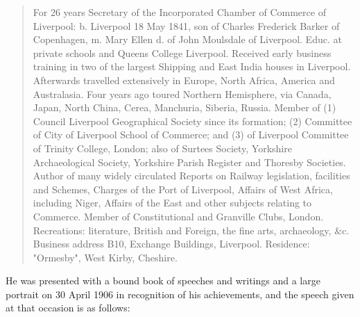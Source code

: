 \begin{quotation}
For 26 years Secretary of the Incorporated Chamber of Commerce of Liverpool: b. Liverpool 18 May 1841, son of Charles Frederick Barker of Copenhagen, m. Mary Ellen d. of John Moulsdale of Liverpool. Educ. at private schools and Queens College Liverpool. Received early business training in two of the largest Shipping and East India houses in Liverpool. Afterwards travelled extensively in Europe, North Africa, America and Australasia. Four years ago toured Northern Hemisphere, via Canada, Japan, North China, Cerea, Manchuria, Siberia, Russia. Member of (1) Council Liverpool Geographical Society since its formation; (2) Committee of City of Liverpool School of Commerce; and (3) of Liverpool Committee of Trinity College, London; also of Surtees Society, Yorkshire Archaeological Society, Yorkshire Parish Register and Thoresby Societies. Author of many widely circulated Reports on Railway legislation, facilities and Schemes, Charges of the Port of Liverpool, Affairs of West Africa, including Niger, Affairs of the East and other subjects relating to Commerce. Member of Constitutional and Granville Clubs, London. Recreations: literature, British and Foreign, the fine arts, archaeology, \&c. Business address B10, Exchange Buildings, Liverpool. Residence: "Ormesby", West Kirby, Cheshire.
\end{quotation}

He was presented with a bound book of speeches and writings and a large portrait on 30 April 1906 in recognition of his achievements,  and the speech given at that occasion is as follows:\cite{THBbio}

